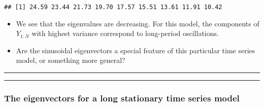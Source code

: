 \documentclass[]{article}
\begin{document}
\begin{verbatim}
## [1] 24.59 23.44 21.73 19.70 17.57 15.51 13.61 11.91 10.42
\end{verbatim}

\begin{itemize}
\item
  We see that the eigenvalues are decreasing. For this model, the
  components of \(Y_{1:N}\) with highest variance correspond to
  long-period oscillations.
\item
  Are the sinusoidal eigenvectors a special feature of this particular
  time series model, or something more general?
\end{itemize}

\begin{center}\rule{0.5\linewidth}{\linethickness}\end{center}

\begin{center}\rule{0.5\linewidth}{\linethickness}\end{center}

\subsubsection{The eigenvectors for a long stationary time series
model}\label{the-eigenvectors-for-a-long-stationary-time-series-model}
\end{document}

